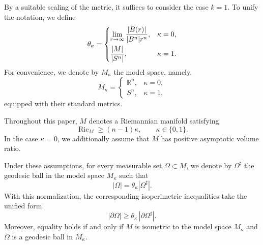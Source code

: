 \documentclass[11pt]{article}
\numberwithin{equation}{section}
\theoremstyle{definition}
\theoremstyle{remark}
\begin{document}
By a suitable scaling of the metric, it suffices to consider the case $k=1$. To unify the notation, we define
\begin{align}{\label{theta}}
\theta_\kappa=
\begin{cases}
\displaystyle
\lim_{r\to\infty}
\frac{|B(r)|}{|B^n|r^n},
& \kappa=0,
\\[2ex]
\displaystyle
\frac{|M|}{|S^n|},
& \kappa=1.
\end{cases}
\end{align}
For convenience, we denote by $M_\kappa$ the model space, namely,
\[
M_\kappa=
\begin{cases}
\mathbb{R}^n, & \kappa=0,\\
S^n, & \kappa=1,
\end{cases}
\]
equipped with their standard metrics.

Throughout this paper, $M$ denotes a Riemannian manifold satisfying
\[
\operatorname{Ric}_M \ge (n-1)\kappa,
\qquad
\kappa\in\{0,1\}.
\]
In the case $\kappa=0$, we additionally assume that $M$ has positive asymptotic volume ratio.

Under these assumptions, for every measurable set
$\Omega\subset M$, we denote by $\Omega^\sharp$ the geodesic ball in the model space $M_\kappa$ such that
\begin{equation}\label{dom}
|\Omega|
=
\theta_\kappa |\Omega^\sharp|.
\end{equation}
With this normalization, the corresponding isoperimetric inequalities take the unified form
\begin{equation}\label{eq:isoperimetric}
|\partial\Omega|
\ge
\theta_\kappa\,|\partial\Omega^\sharp|.
\end{equation}
Moreover,
equality holds if and only if $M$ is isometric to the model space $M_\kappa$ and $\Omega$ is a geodesic ball in $M_\kappa$.
\end{document}
